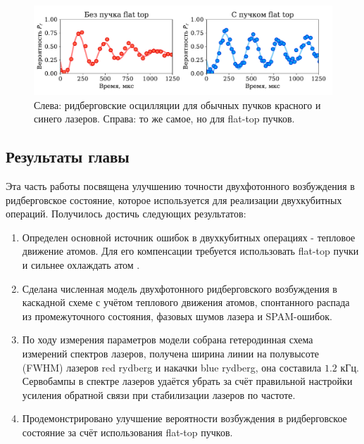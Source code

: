 \begin{figure}[H]
	\centering
	\includegraphics[width=1.0\textwidth]{images/rydberg_flattop_comp.pdf}
	\caption{Слева: ридберговские осцилляции для обычных пучков красного и синего лазеров. Справа: то же самое, но для flat-top пучков.}
	\label{fig:rydberg_flattop_comparison}
\end{figure}

\subsection{Результаты главы}

Эта часть работы посвящена улучшению точности двухфотонного возбуждения в ридберговское состояние, которое используется для реализации двухкубитных операций. Получилось достичь следующих результатов:

\begin{enumerate}
	\item  Определен основной источник ошибок в двухкубитных операциях - тепловое движение атомов. Для его компенсации требуется использовать flat-top пучки \cite{Gillen_Christandl_2016} и сильнее охлаждать атом \cite{PhysRevA.96.033406}.

	\item Сделана численная модель двухфотонного ридберговского возбуждения в каскадной схеме с учётом теплового движения атомов, спонтанного распада из промежуточного состояния, фазовых шумов лазера и SPAM-ошибок. 

	\item По ходу измерения параметров модели собрана гетеродинная схема измерений спектров лазеров, получена ширина линии на полувысоте (FWHM) лазеров red rydberg и накачки blue rydberg, она составила $1.2\text{ кГц}$. Сервобампы в спектре лазеров удаётся убрать за счёт правильной настройки усиления обратной связи при стабилизации лазеров по частоте. 

	\item Продемонстрировано улучшение вероятности возбуждения в ридберговское состояние за счёт использования flat-top пучков.
\end{enumerate}

\newpage